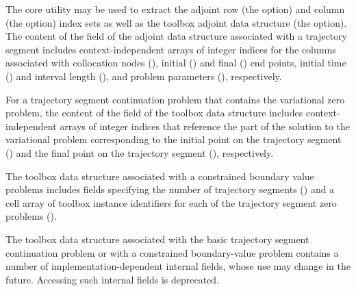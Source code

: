 The  core utility may be used to extract the adjoint row (the  option) and column (the  option) index sets as well as the toolbox adjoint data structure (the  option). The content of the  field of the adjoint data structure associated with a trajectory segment includes context-independent arrays of integer indices for the columns associated with collocation nodes (), initial () and final () end points, initial time () and interval length (), and problem parameters (), respectively. 

For a trajectory segment continuation problem that contains the variational zero problem, the content of the  field of the toolbox data structure includes context-independent arrays of integer indices that reference the part of the solution to the variational problem corresponding to the initial point on the trajectory segment () and the final point on the trajectory segment (), respectively.

The toolbox data structure associated with a constrained boundary value problems includes fields specifying the number of trajectory segments () and a cell array of toolbox instance identifiers for each of the trajectory segment zero problems ().

The toolbox data structure associated with the basic trajectory segment continuation problem or with a constrained boundary-value problem contains a number of implementation-dependent internal fields, whose use may change in the future. Accessing such internal fields is deprecated.

